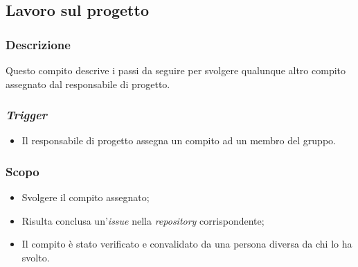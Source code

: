 \subsection{Lavoro sul progetto}
\label{lavoro-sul-progetto}

\subsubsection{Descrizione}
Questo compito descrive i passi da seguire per svolgere qualunque altro compito
assegnato dal responsabile di progetto.

\subsubsection{\textit{Trigger}}
\begin{itemize}
	\item Il responsabile di progetto assegna un compito ad un membro del
	      gruppo.
\end{itemize}

\subsubsection{Scopo}
\begin{itemize}
	\item Svolgere il compito assegnato;
	\item Risulta conclusa un'\textit{issue} nella \textit{repository}
	      corrispondente;
	\item Il compito è stato verificato e convalidato da una persona diversa
	      da chi lo ha svolto.
\end{itemize}

